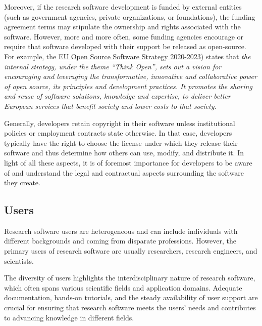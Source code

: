 Moreover, if the research software development is funded by external entities (such as government agencies, private organizations, or foundations), the funding agreement terms may stipulate the ownership and rights associated with the software. However, more and more often, some funding agencies encourage or require that software developed with their support be released as open-source. For example, the \href{https://commission.europa.eu/about-european-commission/departments-and-executive-agencies/digital-services/open-source-software-strategy_en}{EU Open Source Software Strategy 2020-2023}) states that \textit{the internal strategy, under the theme ``Think Open'', sets out a vision for encouraging and leveraging the transformative, innovative and collaborative power of open source, its principles and development practices. It promotes the sharing and reuse of software solutions, knowledge and expertise, to deliver better European services that benefit society and lower costs to that society}.

Generally, developers retain copyright in their software unless institutional policies or employment contracts state otherwise. In that case, developers typically have the right to choose the license under which they release their software and thus determine how others can use, modify, and distribute it. In light of all these aspects, it is of foremost importance for developers to be aware of and understand the legal and contractual aspects surrounding the software they create.


\subsection{Users}

Research software users are heterogeneous and can include individuals with different backgrounds and coming from disparate professions. However, the primary users of research software are usually researchers, research engineers, and scientists.

The diversity of users highlights the interdisciplinary nature of research software, which often spans various scientific fields and application domains. Adequate documentation, hands-on tutorials, and the steady availability of user support are crucial for ensuring that research software meets the users' needs and contributes to advancing knowledge in different fields.

